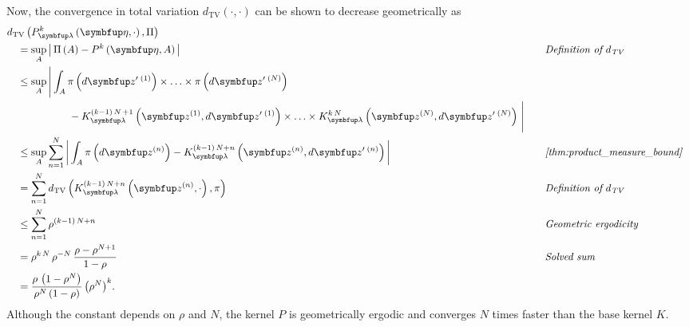 \begin{proofEnd}
  Now, the convergence in total variation \(d_{\mathrm{TV}}\left(\cdot, \cdot\right)\) can be shown to decrease geometrically as
  \begin{alignat}{2}
    &\DTV{P_{\vlambda}^{k}\left(\veta, \cdot\right)}{\Pi}
    \nonumber
    \\
    &\quad=
    \sup_{A}
    \abs{
      \Pi\left(A\right)
      -
      P^{k}\left(\veta, A\right)
    }
    &&\quad\text{\textit{Definition of \(d_{\text{TV}}\)}}
    \nonumber
    \\
    &\quad\leq
    \sup_{A}
    \Bigg|
    \int_{A}
      \pi\left(d\vz^{\prime\;(1)}\right) \times \ldots \times \pi\left(d\vz^{\prime\;(N)}\right)
    \nonumber
      \\
      &\qquad\qquad\qquad-
      K^{(k-1)\,N\,+1}_{\vlambda}\left(\vz^{(1)}, d\vz^{\prime\;(1)}\right) \times \ldots \times K^{k\,N}_{\vlambda}\left(\vz^{(N)}, d\vz^{\prime\;(N)}\right)
    \,\Bigg|
    \nonumber
    \\
    &\quad\leq
    \sup_{A}
    \sum_{n=1}^N
    \abs{
    \int_{A}
      \pi\left(d\vz^{(n)}\right) - K^{(k-1)\,N + n}_{\vlambda}\left(\vz^{(n)}, d\vz^{\prime\;(n)}\right) 
    }
    &&\quad\text{\textit{\cref{thm:product_measure_bound}}}
    \nonumber
    \\
    &\quad=
    \sum_{n=1}^N
    \DTV{K^{(k-1)\,N + n}_{\vlambda}\left(\vz^{(n)}, \cdot\right)}{\pi}
    &&\quad\text{\textit{Definition of \(d_{\text{TV}}\)}}
    \nonumber
    \\
    &\quad\leq
    \sum_{n=1}^N
    \rho^{(k-1)\,N + n}
    &&\quad\text{\textit{Geometric ergodicity}}
    \nonumber
    \\
    &\quad=
    \rho^{k\,N}
    \,
    \rho^{-N}
    \,
    \frac{\rho - \rho^{N+1}}{1 - \rho}
    &&\quad\text{\textit{Solved sum}}
    \nonumber
    \\
    &\quad=
    \frac{\rho \, \left(1 - \rho^N\right)}{\rho^N \left(1 - \rho\right)}
    \,
    {\left( \rho^{N} \right)}^k.
    \nonumber
  \end{alignat}
  Although the constant depends on \(\rho\) and \(N\), the kernel \(P\) is geometrically ergodic and converges \(N\) times faster than the base kernel \(K\).


\end{proofEnd}

